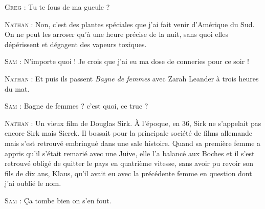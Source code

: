 \begin{dialogue}
\textsc{Greg} : Tu te fous de ma gueule ?

\textsc{Nathan} : Non, c’est des plantes spéciales que j’ai fait venir d’Amérique du Sud. On ne peut les arroser qu’à une heure précise de la nuit, sans quoi elles dépérissent et dégagent des vapeurs toxiques.

\textsc{Sam} : N’importe quoi ! Je crois que j’ai eu ma dose de conneries pour ce soir !

%

\textsc{Nathan} : Et puis ils passent \textit{Bagne de femmes} avec Zarah Leander à trois heures du mat.

\textsc{Sam} : Bagne de femmes ? c’est quoi, ce truc ?

\textsc{Nathan} : Un vieux film de Douglas Sirk. À l’époque, en 36, Sirk ne s’appelait pas encore Sirk mais Sierck. Il bossait pour la principale société de films allemande mais s’est retrouvé embringué dans une sale histoire. Quand sa première femme a appris qu’il s’était remarié avec une Juive, elle l’a balancé aux Boches et il s’est retrouvé obligé de quitter le pays en quatrième vitesse, sans avoir pu revoir son fils de dix ans, Klaus, qu’il avait eu avec la précédente femme en question dont j’ai oublié le nom.

\textsc{Sam} : Ça tombe bien on s’en fout.


\end{dialogue}
